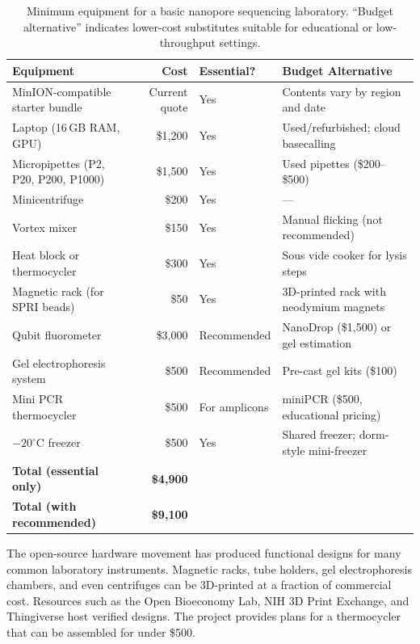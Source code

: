 \begin{table}[htbp]
\centering
\caption[Minimum equipment for a nanopore sequencing laboratory]{Minimum equipment for a basic nanopore sequencing laboratory. ``Budget alternative'' indicates lower-cost substitutes suitable for educational or low-throughput settings.}
\label{tab:accessible:equipment}
\small
\renewcommand{\arraystretch}{1.3}
\begin{tabularx}{\textwidth}{@{}l r l X@{}}
\toprule
\textbf{Equipment} & \textbf{Cost} & \textbf{Essential?} & \textbf{Budget Alternative} \\
\midrule
MinION-compatible starter bundle & Current quote & Yes & Contents vary by region and date \\
Laptop (16\,GB RAM, GPU) & \$1,200 & Yes & Used/refurbished; cloud basecalling \\
Micropipettes (P2, P20, P200, P1000) & \$1,500 & Yes & Used pipettes (\$200--\$500) \\
Minicentrifuge & \$200 & Yes & --- \\
Vortex mixer & \$150 & Yes & Manual flicking (not recommended) \\
Heat block or thermocycler & \$300 & Yes & Sous vide cooker for lysis steps \\
Magnetic rack (for SPRI beads) & \$50 & Yes & 3D-printed rack with neodymium magnets \\
Qubit fluorometer & \$3,000 & Recommended & NanoDrop (\$1,500) or gel estimation \\
Gel electrophoresis system & \$500 & Recommended & Pre-cast gel kits (\$100) \\
Mini \acrshort{PCR} thermocycler & \$500 & For amplicons & miniPCR (\$500, educational pricing) \\
$-20^{\circ}$C freezer & \$500 & Yes & Shared freezer; dorm-style mini-freezer \\
\midrule
\textbf{Total (essential only)} & \textbf{\$4,900} & & \\
\textbf{Total (with recommended)} & \textbf{\$9,100} & & \\
\bottomrule
\end{tabularx}
\end{table}

\begin{tipbox}[title={3D-Printed and Open-Source Lab Equipment}]
The open-source hardware movement has produced functional designs for many common laboratory instruments. Magnetic racks, tube holders, gel electrophoresis chambers, and even centrifuges can be 3D-printed at a fraction of commercial cost. Resources such as the Open Bioeconomy Lab, NIH 3D Print Exchange, and Thingiverse host verified designs. The  project provides plans for a thermocycler that can be assembled for under \$500.
\end{tipbox}

